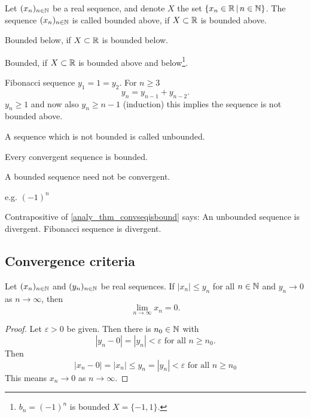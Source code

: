 \documentclass[10pt, a4paper]{article}
\newcommand{\seq}[1][x]{(#1_n)_{n \in \N}}
\begin{document}
\begin{definition}
    Let $\seq$ be a real sequence,
    and denote $X$ the set $\{x_n \in \mathbb{R} \,|\, n \in \mathbb{N}\}$.
    The sequence $\seq$ is called bounded above,
    if $X \subset \mathbb{R}$ is bounded above.

    Bounded below, if $X \subset \mathbb{R}$ is bounded below.

    Bounded, if $X \subset \mathbb{R}$ is bounded above and below\footnote{$b_n = (-1) ^ n$ is bounded $X = \{-1, 1\}$.}.
\end{definition}

\begin{example}
    Fibonacci sequence
    $y_1 = 1 = y_2$.
    For $n \geq 3$
    \[
    y_n = y_{n - 1} + y_{n - 2}.
    \]
    $y_n \geq 1$ and now also $y_n \geq n - 1$ (induction)
    this implies the sequence is not bounded above.
\end{example}
A sequence which is not bounded is called unbounded.

\begin{theorem}\label{analy_thm_convseqisbound}
    Every convergent sequence is bounded.
\end{theorem}
\begin{remark}
    A bounded sequence need not be convergent.
    
    e.g. $(-1) ^ n$
\end{remark}

Contrapositive of \autoref{analy_thm_convseqisbound} says:
An unbounded sequence is divergent.
Fibonacci sequence is divergent.

\subsection{Convergence criteria}
\begin{theorem}\label{analy_thm_squeezethm}
    Let $\seq$ and $\seq[y]$ be real sequences.
    If $|x_n| \leq y_n$ for all $n \in \mathbb{N}$ and $y_n \rightarrow 0$ as $n \rightarrow \infty$, then
    \[
    \lim_{n \rightarrow \infty}x_n = 0.
    \]
    \begin{proof}
        Let $\varepsilon > 0$ be given.
        Then there is $n_0 \in \mathbb{N}$ with
        \[
        |y_n - 0| = |y_n| < \varepsilon\text{ for all } n \geq n_0.
        \]
        Then
        \[
        |x_n - 0| = |x_n| \leq y_n = |y_n| < \varepsilon\text{ for all } n \geq n_0
        \]
        This means $x_n \rightarrow 0$ as $n \rightarrow \infty$.
    \end{proof}
\end{theorem}
\end{document}
